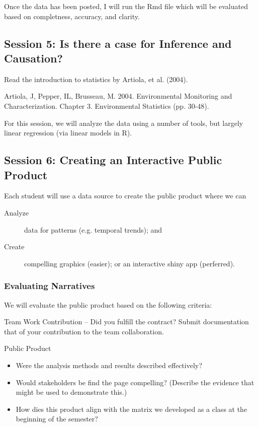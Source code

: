 \documentclass{article}\usepackage[]{graphicx}\usepackage[]{color}
\newenvironment{itemize*}%
  {\begin{itemize}%
    \setlength{\itemsep}{0pt}%
    \setlength{\parskip}{0pt}}%
  {\end{itemize}}
\begin{document}
Once the data has been posted, I will run the Rmd file which will be evaluated based on completness, accuracy, and clarity.  

\subsection{Session 5: Is there a case for Inference and Causation?}

Read the introduction to statistics by Artiola, et al. (2004). 

  \begin{itemize*}
  		\item Artiola, J, Pepper, IL, Brusseau, M. 2004. Environmental Monitoring and Characterization. Chapter 3. Environmental Statistics (pp. 30-48).
\end{itemize*}

For this session, we will analyze the data using a number of tools, but largely linear regression (via linear models in R). 


\subsection{Session 6: Creating an Interactive Public Product}

Each student will use a data source to create the public product where we can 
\begin{description}
  \item[Analyze] data for patterns (e.g. temporal trends); and
  \item[Create] compelling graphics (easier); or an interactive shiny app (perferred).
\end{description}

\subsubsection{Evaluating Narratives}

We will evaluate the public product based on the following criteria:

\begin{itemize*}
  \item Team Work Contribution -- Did you fulfill the contract? Submit documentation that of your contribution to the team collaboration.
  \item Public Product
    \begin{itemize}
      \item Were the analysis methods and results described effectively?
      \item Would stakeholders be find the page compelling? (Describe the evidence that might be used to demonstrate this.)
      \item How dies this product align with the matrix we developed as a class at the beginning of the semester?
    \end{itemize}

\end{itemize*}
\end{document}
